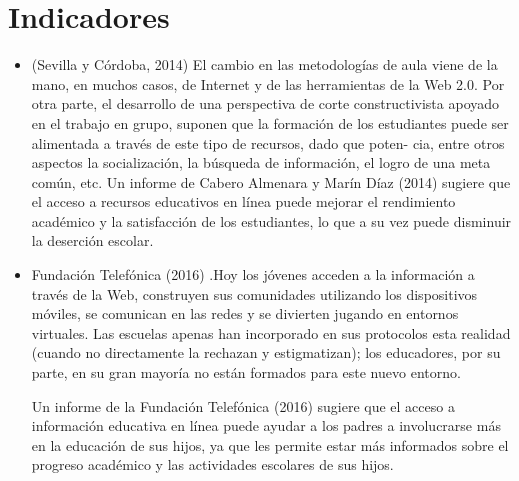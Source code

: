 \section{Indicadores}
\begin{itemize}
	\item(Sevilla y Córdoba, 2014) El cambio en las metodologías de aula viene de la mano, en muchos casos, de Internet y de las herramientas de la Web 2.0. Por otra parte, el desarrollo de una perspectiva de corte constructivista apoyado en el trabajo en grupo, suponen que la formación de los estudiantes puede ser alimentada a través de este tipo de recursos, dado que poten- cia, entre otros aspectos la socialización, la búsqueda de información, el logro de una meta común, etc.
	Un informe de Cabero Almenara y Marín Díaz (2014) sugiere que el acceso a recursos educativos en línea puede mejorar el rendimiento académico y la satisfacción de los estudiantes, lo que a su vez puede disminuir la deserción escolar.
	\item Fundación Telefónica (2016) .Hoy los jóvenes acceden a la información a través de la Web, construyen sus comunidades utilizando los dispositivos móviles, se comunican en las redes y se divierten jugando en entornos virtuales. Las escuelas apenas han incorporado en sus protocolos esta realidad (cuando no directamente la rechazan y estigmatizan); los educadores, por su parte, en su gran mayoría no están formados para este nuevo entorno. 
	
	Un informe de la Fundación Telefónica (2016) sugiere que el acceso a información educativa en línea puede ayudar a los padres a involucrarse más en la educación de sus hijos, ya que les permite estar más informados sobre el progreso académico y las actividades escolares de sus hijos.
	
\end{itemize}
